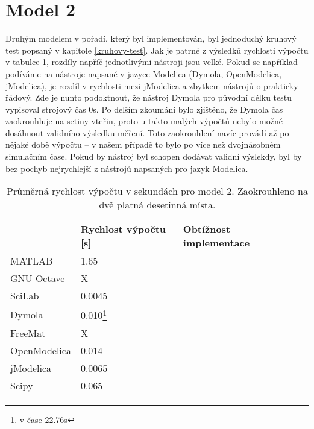 \section{Model 2}
\label{srovnani-kruh}
Druhým modelem v pořadí, který byl implementován, byl jednoduchý kruhový test popsaný v kapitole \ref{kruhovy-test}. Jak je patrné z výsledků rychlosti výpočtu v tabulce \ref{tab:kruh-tabulka}, rozdíly napříč jednotlivými nástroji jsou velké. Pokud se například podíváme na nástroje napsané v jazyce Modelica (Dymola, OpenModelica, jModelica), je rozdíl v rychlosti mezi jModelica a zbytkem nástrojů o prakticky řádový. Zde je nunto podoktnout, že nástroj Dymola pro původní délku testu vypisoval strojový čas 0s. Po delším zkoumání bylo zjištěno, že Dymola čas zaokrouhluje na setiny vteřin, proto u takto malých výpočtů nebylo možné dosáhnout validního  výsledku měření. Toto zaokrouhlení navíc provádí až po nějaké době výpočtu -- v našem případě to bylo po více než dvojnásobném simulačním čase. Pokud by nástroj byl schopen dodávat validní výslekdy, byl by bez pochyb nejrychlejší z nástrojů napsaných pro jazyk Modelica.

\begin{savenotes}
\begin{table}[ht]
\centering
\begin{tabular}{|l|l|l|l|}
\hline
             & Rychlost výpočtu {[}s{]} & Obtížnost implementace &  \\ \hline
MATLAB       &         1.65                 &  &  \\ \hline
GNU Octave   &           X               &  &  \\ \hline
SciLab       &            0.0045              &  &  \\ \hline
Dymola       &           0.010\footnote{v čase 22.76s}               &  &  \\ \hline
FreeMat &                  X        &  &  \\ \hline
OpenModelica    &        0.014                  &  &  \\ \hline
jModelica        &       0.0065              &  &  \\ \hline
Scipy             &      0.065                    &  &  \\ \hline
\end{tabular}
\caption{Průměrná rychlost výpočtu v sekundách pro model 2. Zaokrouhleno na dvě platná desetinná místa.}
\label{tab:kruh-tabulka}
\end{table}
\end{savenotes}

